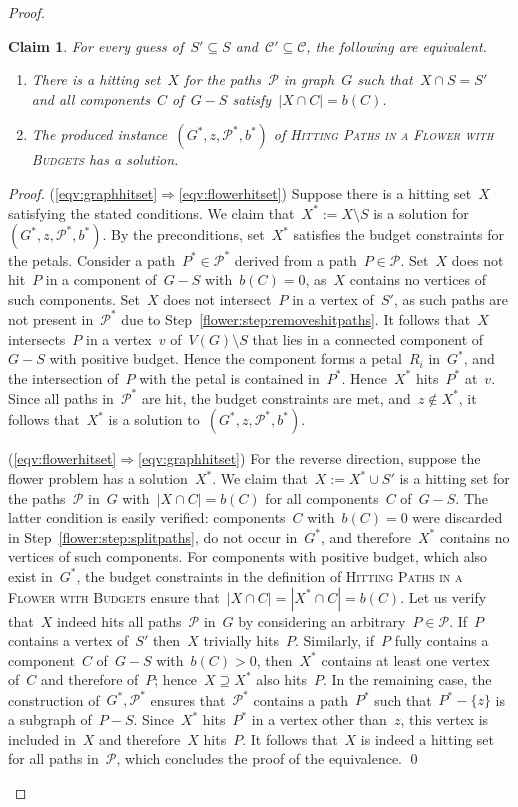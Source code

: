 \let\accentvec\vec  \documentclass{llncs}
\newtheorem{numberedclaim}{Claim}
\newcommand{\claimqed}{\renewcommand{\squareforqed}{$\lrcorner$}\qed\renewcommand{\squareforqed}{\plainsquareforqed}}
\newcommand{\C}{{\mathcal{C}}}
\renewcommand{\P}{\ensuremath{\mathcal{P}}\xspace}
\renewcommand{\C}{\ensuremath{\mathcal{C}}\xspace}
\newcommand{\HitPathsInFlower}{\textsc{Hitting Paths in a Flower with Budgets}\xspace}
\begin{document}
\begin{proof}
\begin{numberedclaim}
For every guess of~$S' \subseteq S$ and~$\C' \subseteq \C$, the following are equivalent. 
\begin{enumerate}
	\item There is a hitting set~$X$ for the paths~$\P$ in graph~$G$ such that~$X \cap S = S'$ and all components~$C$ of~$G-S$ satisfy~$|X \cap C| = b(C)$.\label{eqv:graphhitset}
	\item The produced instance~$(G^*,z,\P^*,b^*)$ of \HitPathsInFlower has a solution.\label{eqv:flowerhitset}
\end{enumerate}
\end{numberedclaim}
\begin{proof}
(\ref{eqv:graphhitset}$\Rightarrow$\ref{eqv:flowerhitset}) Suppose there is a hitting set~$X$ satisfying the stated conditions. We claim that~$X^* := X \setminus S$ is a solution for~$(G^*,z,\P^*,b^*)$. By the preconditions, set~$X^*$ satisfies the budget constraints for the petals. Consider a path~$P^* \in \P^*$ derived from a path~$P \in \P$. Set~$X$ does not hit~$P$ in a component of~$G - S$ with~$b(C) = 0$, as~$X$ contains no vertices of such components. Set~$X$ does not intersect~$P$ in a vertex of~$S'$, as such paths are not present in~$\P^*$ due to Step~\ref{flower:step:removeshitpaths}. It follows that~$X$ intersects~$P$ in a vertex~$v$ of~$V(G) \setminus S$ that lies in a connected component of~$G - S$ with positive budget. Hence the component forms a petal~$R_i$ in~$G^*$, and the intersection of~$P$ with the petal is contained in~$P^*$. Hence~$X^*$ hits~$P^*$ at~$v$. Since all paths in~$\P^*$ are hit, the budget constraints are met, and~$z \not \in X^*$, it follows that~$X^*$ is a solution to~$(G^*,z,\P^*,b^*)$.

(\ref{eqv:flowerhitset}$\Rightarrow$\ref{eqv:graphhitset}) For the reverse direction, suppose the flower problem has a solution~$X^*$. We claim that~$X := X^* \cup S'$ is a hitting set for the paths~$\P$ in~$G$ with~$|X \cap C| = b(C)$ for all components~$C$ of~$G - S$. The latter condition is easily verified: components~$C$ with~$b(C) = 0$ were discarded in Step~\ref{flower:step:splitpaths}, do not occur in~$G^*$, and therefore~$X^*$ contains no vertices of such components. For components with positive budget, which also exist in~$G^*$, the budget constraints in the definition of \HitPathsInFlower ensure that~$|X \cap C| = |X^* \cap C| = b(C)$. Let us verify that~$X$ indeed hits all paths~$\P$ in~$G$ by considering an arbitrary~$P \in \P$. If~$P$ contains a vertex of~$S'$ then~$X$ trivially hits~$P$. Similarly, if~$P$ fully contains a component~$C$ of~$G - S$ with~$b(C) > 0$, then~$X^*$ contains at least one vertex of~$C$ and therefore of~$P$; hence~$X \supseteq X^*$ also hits~$P$. In the remaining case, the construction of~$G^*,\P^*$ ensures that~$\P^*$ contains a path~$P^*$ such that~$P^* - \{z\}$ is a subgraph of~$P - S$. Since~$X^*$ hits~$P^*$ in a vertex other than~$z$, this vertex is included in~$X$ and therefore~$X$ hits~$P$. It follows that~$X$ is indeed a hitting set for all paths in~$\P$, which concludes the proof of the equivalence.
\claimqed
\end{proof}


\end{proof}
\end{document}
